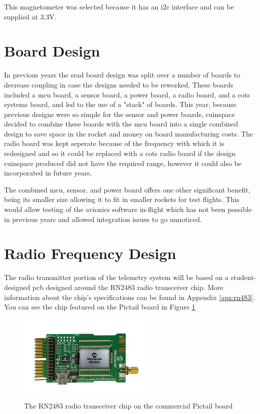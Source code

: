 This magnetometer was selected because it has an \gls{i2c} interface and can be supplied at 3.3V.
\cite{lsm6dso32-datasheet}

\section{Board Design}

In previous years the \gls{srad} board design was split over a number of boards to decrease coupling in case the
designs needed to be reworked. These boards included a \gls{mcu} board, a sensor board, a power board, a radio board,
and a \gls{cots} systems board, and led to the use of a "stack" of boards. This year, because previous designs were so
simple for the sensor and power boards, \gls{cuinspace} decided to combine these boards with the \gls{mcu} board
into a single combined design to save space in the rocket and money on board manufacturing costs. The radio board was kept seperate
because of the frequency with which it is redesigned and so it could be replaced with a \gls{cots} radio board if the
design \gls{cuinspace} produced did not have the required range, however it could also be incorporated in future years.

The combined \gls{mcu}, sensor, and power board offers one other significant benefit, being its smaller size allowing it to fit
in smaller rockets for test flights. This would allow testing of the avionics software in-flight which has not been possible in
previous years and allowed integration issues to go unnoticed.

\section{Radio Frequency Design}

The radio transmitter portion of the telemetry system will be based on a student-designed \gls{pcb} designed around the
RN2483 radio transceiver chip. More information about the chip's specifications can be found in Appendix
\ref{apx:rn483}. You can see the chip featured on the Pictail board in Figure \ref{fig:pictail}

\begin{figure}[H]
    \centering
    \includegraphics[width=2.5in]{assets/images/pictail.jpg}
    \caption{The RN2483 radio transceiver chip on the commercial Pictail board \cite{pictail-img}}
    \label{fig:pictail}
\end{figure}


